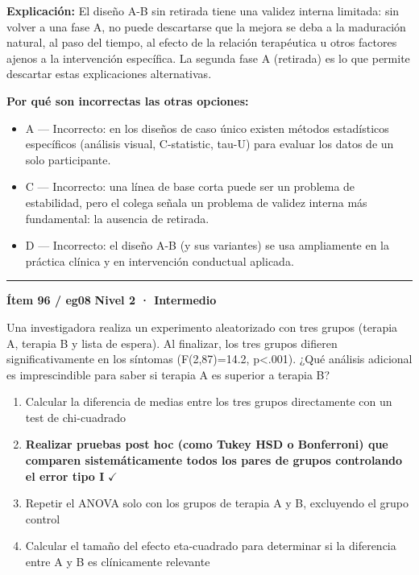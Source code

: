 \documentclass[12pt,a4paper]{article}
\begin{document}
\noindent\textbf{\color{azul}Explicación:} El diseño A-B sin retirada tiene una validez interna limitada: sin volver a una fase A, no puede descartarse que la mejora se deba a la maduración natural, al paso del tiempo, al efecto de la relación terapéutica u otros factores ajenos a la intervención específica. La segunda fase A (retirada) es lo que permite descartar estas explicaciones alternativas.

\noindent\textbf{\color{gris}Por qué son incorrectas las otras opciones:}
\begin{itemize}
  \item {\small A — Incorrecto: en los diseños de caso único existen métodos estadísticos específicos (análisis visual, C-statistic, tau-U) para evaluar los datos de un solo participante.}
  \item {\small C — Incorrecto: una línea de base corta puede ser un problema de estabilidad, pero el colega señala un problema de validez interna más fundamental: la ausencia de retirada.}
  \item {\small D — Incorrecto: el diseño A-B (y sus variantes) se usa ampliamente en la práctica clínica y en intervención conductual aplicada.}
\end{itemize}
\vspace{8pt}\hrule\vspace{10pt}

\begin{mdframed}[backgroundcolor=fondogris,linecolor=ambar,linewidth=1pt,innerleftmargin=10pt,innerrightmargin=10pt,innertopmargin=7pt,innerbottommargin=7pt]
\textbf{Ítem 96 / eg08} \hfill {\small\bfseries\color{ambar} Nivel 2 · Intermedio}
\end{mdframed}

Una investigadora realiza un experimento aleatorizado con tres grupos (terapia A, terapia B y lista de espera). Al finalizar, los tres grupos difieren significativamente en los síntomas (F(2,87)=14.2, p<.001). ¿Qué análisis adicional es imprescindible para saber si terapia A es superior a terapia B?

\begin{enumerate}
  \item[A.] Calcular la diferencia de medias entre los tres grupos directamente con un test de chi-cuadrado
  \item[\textbf{\color{verde}B.}] \textbf{\color{verde} Realizar pruebas post hoc (como Tukey HSD o Bonferroni) que comparen sistemáticamente todos los pares de grupos controlando el error tipo I} \hfill $\checkmark$
  \item[C.] Repetir el ANOVA solo con los grupos de terapia A y B, excluyendo el grupo control
  \item[D.] Calcular el tamaño del efecto eta-cuadrado para determinar si la diferencia entre A y B es clínicamente relevante
\end{enumerate}
\end{document}
